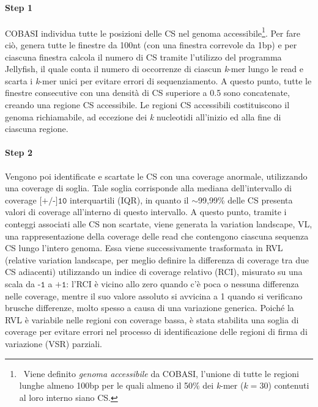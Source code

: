 \documentclass[../main.tex]{subfiles}
\begin{document}
\paragraph{Step 1} COBASI individua tutte le posizioni delle CS nel genoma accessibile\footnote{\ Viene definito \textit{genoma accessibile} da COBASI, l'unione di tutte le regioni lunghe almeno 100bp per le quali almeno il 50\% dei \textit{k}-mer ($k = 30$) contenuti al loro interno siano CS.}. Per fare ciò, genera tutte le finestre da 100nt (con una finestra correvole da 1bp) e per ciascuna finestra calcola il numero di CS tramite l'utilizzo del programma Jellyfish, il quale conta il numero di occorrenze di ciascun \textit{k}-mer lungo le read e scarta i \textit{k}-mer unici per evitare errori di sequenziamento. A questo punto, tutte le finestre consecutive con una densità di CS superiore a 0.5 sono concatenate, creando una regione CS accessibile. Le regioni CS accessibili costituiscono il genoma richiamabile, ad eccezione dei \textit{k} nucleotidi all'inizio ed alla fine di ciascuna regione.

\paragraph{Step 2} Vengono poi identificate e scartate le CS con una coverage anormale, utilizzando una coverage di soglia. Tale soglia corrisponde alla mediana dell'intervallo di coverage $\texttt{[+/-]10}$ interquartili (IQR), in quanto il $\sim$99,99\% delle CS presenta valori di coverage all'interno di questo intervallo. A questo punto, tramite i conteggi associati alle CS non scartate, viene generata la variation landscape, VL, una rappresentazione della coverage delle read che contengono ciascuna sequenza CS lungo l'intero genoma. Essa viene successivamente trasformata in RVL (relative variation landscape, per meglio definire la differenza di coverage tra due CS adiacenti) utilizzando un indice di coverage relativo (RCI), misurato su una scala da $\texttt{-1}$ a $\texttt{+1}$: l'RCI è vicino allo zero quando c'è poca o nessuna differenza nelle coverage, mentre il suo valore assoluto si avvicina a 1 quando si verificano brusche differenze, molto spesso a causa di una variazione generica. Poiché la RVL è variabile nelle regioni con coverage bassa, è stata stabilita una soglia di coverage per evitare errori nel processo di identificazione delle regioni di firma di variazione (VSR) parziali.
\end{document}
